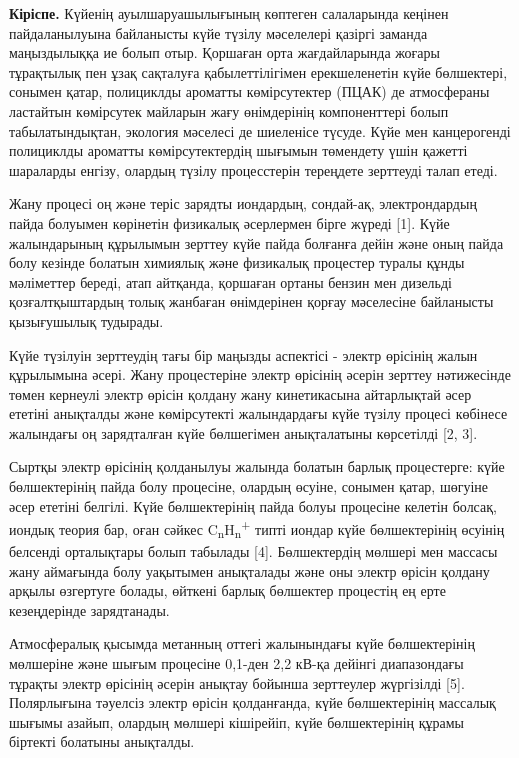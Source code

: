 \begin{multicols}{2}
{\bfseries Кіріспе.} Күйенің ауылшаруашылығының көптеген салаларында
кеңінен пайдаланылуына байланысты күйе түзілу мәселелері қазіргі заманда
маңыздылыққа ие болып отыр. Қоршаған орта жағдайларында жоғары
тұрақтылық пен ұзақ сақталуға қабылеттілігімен ерекшеленетін күйе
бөлшектері, сонымен қатар, полициклды ароматты көмірсутектер (ПЦАК) де
атмосфераны ластайтын көмірсутек майларын жағу өнімдерінің компоненттері
болып табылатындықтан, экология мәселесі де шиеленісе түсуде. Күйе мен
канцерогенді полициклды ароматты көмірсутектердің шығымын төмендету үшін
қажетті шараларды енгізу, олардың түзілу процесстерін тереңдете
зерттеуді талап етеді.

Жану процесі оң және теріс зарядты иондардың, сондай-ақ, электрондардың
пайда болуымен көрінетін физикалық әсерлермен бірге жүреді {[}1{]}. Күйе
жалындарының құрылымын зерттеу күйе пайда болғанға дейін және оның пайда
болу кезінде болатын химиялық және физикалық процестер туралы құнды
мәліметтер береді, атап айтқанда, қоршаған ортаны бензин мен дизельді
қозғалтқыштардың толық жанбаған өнімдерінен қорғау мәселесіне байланысты
қызығушылық тудырады.

Күйе түзілуін зерттеудің тағы бір маңызды аспектісі - электр өрісінің
жалын құрылымына әсері. Жану процестеріне электр өрісінің әсерін зерттеу
нәтижесінде төмен кернеулі электр өрісін қолдану жану кинетикасына
айтарлықтай әсер ететіні анықталды және көмірсутекті жалындардағы күйе
түзілу процесі көбінесе жалындағы оң зарядталған күйе бөлшегімен
анықталатыны көрсетілді {[}2, 3{]}.

Сыртқы электр өрісінің қолданылуы жалында болатын барлық процестерге:
күйе бөлшектерінің пайда болу процесіне, олардың өсуіне, сонымен қатар,
шөгуіне әсер ететіні белгілі. Күйе бөлшектерінің пайда болуы процесіне
келетін болсақ, иондық теория бар, оған сәйкес
C\textsubscript{n}H\textsubscript{n}\textsuperscript{+} типті иондар
күйе бөлшектерінің өсуінің белсенді орталықтары болып табылады {[}4{]}.
Бөлшектердің мөлшері мен массасы жану аймағында болу уақытымен
анықталады және оны электр өрісін қолдану арқылы өзгертуге болады,
өйткені барлық бөлшектер процестің ең ерте кезеңдерінде зарядтанады.

Атмосфералық қысымда метанның оттегі жалынындағы күйе бөлшектерінің
мөлшеріне және шығым процесіне 0,1-ден 2,2 кВ-қа дейінгі диапазондағы
тұрақты электр өрісінің әсерін анықтау бойынша зерттеулер жүргізілді
{[}5{]}. Полярлығына тәуелсіз электр өрісін қолданғанда, күйе
бөлшектерінің массалық шығымы азайып, олардың мөлшері кішірейіп, күйе
бөлшектерінің құрамы біртекті болатыны анықталды.


\end{multicols}
